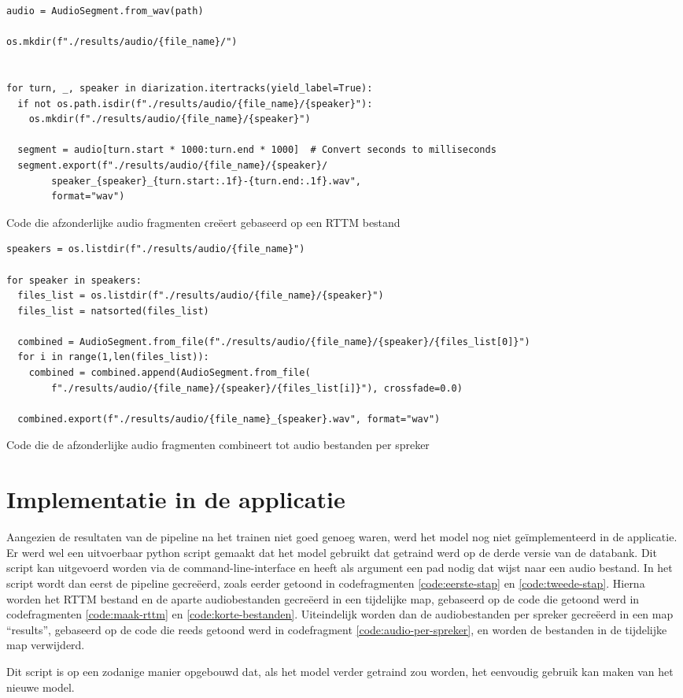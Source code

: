\begin{listing}
	\begin{verbatim}
audio = AudioSegment.from_wav(path)

os.mkdir(f"./results/audio/{file_name}/")


for turn, _, speaker in diarization.itertracks(yield_label=True):
  if not os.path.isdir(f"./results/audio/{file_name}/{speaker}"):
    os.mkdir(f"./results/audio/{file_name}/{speaker}")

  segment = audio[turn.start * 1000:turn.end * 1000]  # Convert seconds to milliseconds
  segment.export(f"./results/audio/{file_name}/{speaker}/
        speaker_{speaker}_{turn.start:.1f}-{turn.end:.1f}.wav",
        format="wav")
	\end{verbatim}
	\caption[Code om korte audio bestanden te creëren]{\label{code:korte-bestanden}Code die afzonderlijke audio fragmenten creëert gebaseerd op een RTTM bestand}
\end{listing}

\begin{listing}
	\begin{verbatim}
speakers = os.listdir(f"./results/audio/{file_name}")

for speaker in speakers:
  files_list = os.listdir(f"./results/audio/{file_name}/{speaker}")
  files_list = natsorted(files_list)

  combined = AudioSegment.from_file(f"./results/audio/{file_name}/{speaker}/{files_list[0]}")
  for i in range(1,len(files_list)):
    combined = combined.append(AudioSegment.from_file(
        f"./results/audio/{file_name}/{speaker}/{files_list[i]}"), crossfade=0.0)

  combined.export(f"./results/audio/{file_name}_{speaker}.wav", format="wav")
	\end{verbatim}
	\caption[Code om audio bestanden per spreker te creëren]{\label{code:audio-per-spreker}Code die de afzonderlijke audio fragmenten combineert tot audio bestanden per spreker}
\end{listing}

\section{Implementatie in de applicatie}
\label{sec:implementatie}
Aangezien de resultaten van de pipeline na het trainen niet goed genoeg waren, werd het model nog niet geïmplementeerd in de applicatie. Er werd wel een uitvoerbaar python script gemaakt dat het model gebruikt dat getraind werd op de derde versie van de databank. Dit script kan uitgevoerd worden via de command-line-interface en heeft als argument een pad nodig dat wijst naar een audio bestand. In het script wordt dan eerst de pipeline gecreëerd, zoals eerder getoond in codefragmenten \ref{code:eerste-stap} en \ref{code:tweede-stap}. Hierna worden het RTTM bestand en de aparte audiobestanden gecreëerd in een tijdelijke map, gebaseerd op de code die getoond werd in codefragmenten \ref{code:maak-rttm} en \ref{code:korte-bestanden}. Uiteindelijk worden dan de audiobestanden per spreker gecreëerd in een map ``results'', gebaseerd op de code die reeds getoond werd in codefragment \ref{code:audio-per-spreker}, en worden de bestanden in de tijdelijke map verwijderd.

Dit script is op een zodanige manier opgebouwd dat, als het model verder getraind zou worden, het eenvoudig gebruik kan maken van het nieuwe model.
